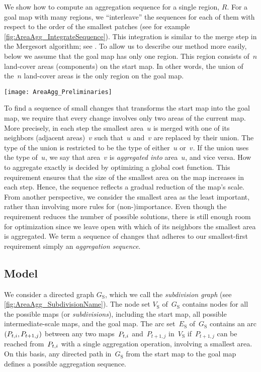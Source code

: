 We show how to compute an aggregation sequence 
for a single region, $R$. 
For a goal map with many regions,
we ``interleave'' the sequences for each of them
with respect to the order of the smallest patches 
(see for example \fig\ref{fig:AreaAgg_IntegrateSequence}).
This integration is similar to the merge step in the 
Mergesort algorithm; 
see \textcite[]{Cormen2009}.
To allow us to describe our method more easily,
below we assume that the goal map has only one region.
This region consists of~$n$ land-cover 
areas (components) on the start map. 
In other words, the union of the~$n$ land-cover areas 
is the only region on the goal map.
\begin{figure*}[tb]
\centering
\texttt{[image: AreaAgg\_Preliminaries]}
\caption{Integrating two aggregation sequences 
	of different regions: 
	the resulting sequence contains the given sequences 
	as subsequences and 
	always takes the subdivision with smallest patch next.
	The gray arrows show the integration of the two regions.
}
\label{fig:AreaAgg_IntegrateSequence}
\end{figure*}


To find a sequence of small changes 
that transforms the start map into the goal map,
we require that 
every change involves only two areas of the current map.
More precisely, in each step the smallest area~$u$ is merged 
with one of its neighbors (adjacent areas)~$v$
such that~$u$ and~$v$ are replaced by their union.
The type of the union is restricted to be 
the type of either~$u$ or~$v$.
If the union uses the type of~$u$, 
we say that area~$v$ is \emph{aggregated into} area~$u$, 
and vice versa. 
How to aggregate exactly is decided by 
optimizing a global cost function.
This requirement ensures that the 
size of the smallest area on the map increases in each step.
Hence, the sequence reflects a gradual reduction of the 
map's scale.
From another perspective, 
we consider the smallest area as the least important, 
rather than involving more rules for (non-)importance. 
Even though the requirement reduces 
the number of possible solutions,
there is still enough room for optimization 
since we leave open with
which of its neighbors the smallest area is aggregated.
We term a sequence of changes 
that adheres to our smallest-first requirement simply 
an \emph{aggregation sequence}.


\subsection{Model}
\label{sec:AreaAgg_Model}
We consider a directed graph $G_\mathrm{S}$, 
which we call the \emph{subdivision graph} 
(see \fig\ref{fig:AreaAgg_SubdivisionName}). 
The node set $V_\mathrm{S}$ of~$G_\mathrm{S}$ 
contains nodes for all the
possible maps (or \emph{subdivisions}), including the start map, 
all possible intermediate-scale maps, and the goal map.
The arc set~$E_\mathrm{S}$ of~$G_\mathrm{S}$ 
contains an arc $(P_{t,i}, P_{t+1,j})$ 
between any two maps~$P_{t,i}$ and~$P_{t+1,j}$ in~$V_\mathrm{S}$ 
if~$P_{t+1,j}$ can be reached from~$P_{t,i}$ 
with a single aggregation operation,
involving a smallest area.
On this basis, any directed path in~$G_\mathrm{S}$ 
from the start map to the goal map
defines a possible aggregation sequence.

